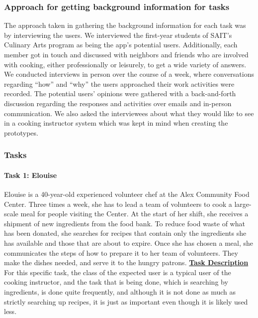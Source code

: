 \documentclass[11pt,english]{article}
\begin{document}
\subsubsection{Approach for getting background information for tasks}
The approach taken in gathering the background information for each task was by interviewing the users. We interviewed the first-year students of SAIT’s Culinary Arts program as being the app’s potential users. Additionally, each member got in touch and discussed with neighbors and friends who are involved with cooking, either professionally or leisurely, to get a wide variety of answers. We conducted interviews in person over the course of a week, where conversations regarding “how” and “why” the users approached their work activities were recorded. The potential users’ opinions were gathered with a back-and-forth discussion regarding the responses and activities over emails and in-person communication. We also asked the interviewees about what they would like to see in a cooking instructor system which was kept in mind when creating the prototypes.
\newpage
\subsubsection{Tasks}
\paragraph{Task 1: Elouise}
Elouise is a 40-year-old experienced volunteer chef at the Alex Community Food Center. Three times a week, she has to lead a team of volunteers to cook a large-scale meal for people visiting the Center. At the start of her shift, she receives a shipment of new ingredients from the food bank. To reduce food waste of what has been donated, she searches for recipes that contain only the ingredients she has available and those that are about to expire. Once she has chosen a meal, she communicates the steps of how to prepare it to her team of volunteers. They make the dishes needed, and serve it to the hungry patrons.
\newline
\newline
\textbf{\underline{Task Description}}
\newline
\newline
For this specific task, the class of the expected user is a typical user of the cooking instructor, and the task that is being done, which is searching by ingredients, is done quite frequently, and although it is not done as much as strictly searching up recipes, it is just as important even though it is likely used less.
\newline
\end{document}
